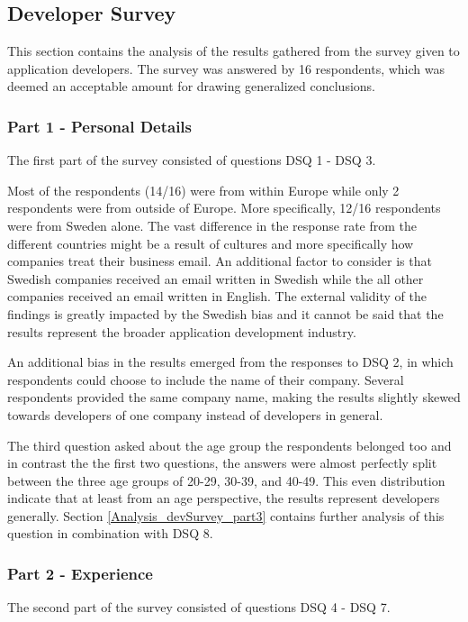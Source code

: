 \documentclass[a4paper,12pt]{article}
\begin{document}
\subsection{Developer Survey}
\label{Analysis_devSurvey}
This section contains the analysis of the results gathered from the survey given to application developers. The survey was answered by 16 respondents, which was deemed an acceptable amount for drawing generalized conclusions.

\subsubsection{Part 1 - Personal Details}
\label{Analysis_devSurvey_part1}
The first part of the survey consisted of questions DSQ 1 - DSQ 3.

Most of the respondents (14/16) were from within Europe while only 2 respondents were from outside of Europe. More specifically, 12/16 respondents were from Sweden alone. The vast difference in the response rate from the different countries might be a result of cultures and more specifically how companies treat their business email. An additional factor to consider is that Swedish companies received an email written in Swedish while the all other companies received an email written in English. The external validity of the findings is greatly impacted by the Swedish bias and it cannot be said that the results represent the broader application development industry.

An additional bias in the results emerged from the responses to DSQ 2, in which respondents could choose to include the name of their company. Several respondents provided the same company name, making the results slightly skewed towards developers of one company instead of developers in general.

The third question asked about the age group the respondents belonged too and in contrast the the first two questions, the answers were almost perfectly split between the three age groups of 20-29, 30-39, and 40-49. This even distribution indicate that at least from an age perspective, the results represent developers generally. Section \ref{Analysis_devSurvey_part3} contains further analysis of this question in combination with DSQ 8.

\subsubsection{Part 2 - Experience}
\label{Analysis_devSurvey_part2}
The second part of the survey consisted of questions DSQ 4 - DSQ 7.
\end{document}
